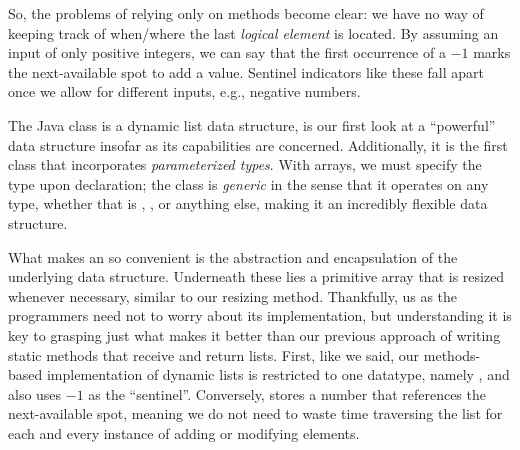 So, the problems of relying only on methods become clear: we have no way of keeping track of when/where the last \textit{logical element} is located. By assuming an input of only positive integers, we can say that the first occurrence of a $-1$ marks the next-available spot to add a value. Sentinel indicators like these fall apart once we allow for different inputs, e.g., negative numbers. 

The Java  class is a dynamic list data structure, is our first look at a ``powerful'' data structure insofar as its capabilities are concerned. Additionally, it is the first class that incorporates \textit{parameterized types}. With arrays, we must specify the type upon declaration; the  class is \textit{generic} in the sense that it operates on any type, whether that is , , or anything else, making it an incredibly flexible data structure. 

What makes an  so convenient is the abstraction and encapsulation of the underlying data structure. Underneath these lies a primitive array that is resized whenever necessary, similar to our resizing method. Thankfully, us as the programmers need not to worry about its implementation, but understanding it is key to grasping just what makes it better than our previous approach of writing static methods that receive and return lists. First, like we said, our methods-based implementation of dynamic lists is restricted to one datatype, namely , and also uses $-1$ as the ``sentinel''. Conversely,  stores a number that references the next-available spot, meaning we do not need to waste time traversing the list for each and every instance of adding or modifying elements.

